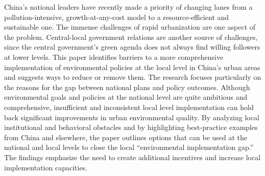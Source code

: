China's national leaders have recently made a priority of changing lanes from a pollution-intensive, growth-at-any-cost model to a resource-efficient and sustainable one. The immense challenges of rapid urbanization are one aspect of the problem. Central-local government relations are another source of challenges, since the central government's green agenda does not always find willing followers at lower levels. This paper identifies barriers to a more comprehensive implementation of environmental policies at the local level in China's urban areas and suggests ways to reduce or remove them. The research focuses particularly on the reasons for the gap between national plans and policy outcomes. Although environmental goals and policies at the national level are quite ambitious and comprehensive, insufficient and inconsistent local level implementation can hold back significant improvements in urban environmental quality. By analyzing local institutional and behavioral obstacles and by highlighting best-practice examples from China and elsewhere, the paper outlines options that can be used at the national and local levels to close the local “environmental implementation gap.” The findings emphasize the need to create additional incentives and increase local implementation capacities.
